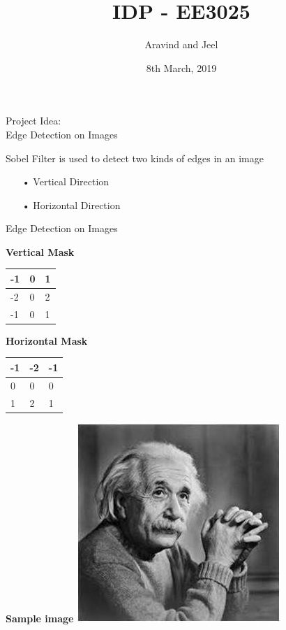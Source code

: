 \documentclass[11pt]{beamer}
\author{Aravind and Jeel}
\title{IDP - EE3025}
\institute{IIT Hyderabad}
\date{8th March, 2019}
\begin{document}
\begin{frame}
\titlepage
\end{frame}

\begin{frame}{Project Idea: \\ Edge Detection on Images}

	Sobel Filter is used to detect two kinds of edges in an image \\
	\begin{itemize}
	\item[•] Vertical Direction
	\item[•] Horizontal Direction
	\end{itemize}
	
\end{frame}

\begin{frame}{Edge Detection on Images}
	
	\textbf{Vertical Mask}
	\begin{center}
	
	\begin{tabular}{|m{1cm}|m{1cm}|m{1cm}|}
	\hline
	-1 & 0 & 1 \\
	\hline
	-2 & 0 & 2 \\
	\hline
	-1 & 0 & 1 \\
	\hline
	
	\end{tabular}
	\end{center}
	\pause
	\textbf{Horizontal Mask}
	\begin{center}
	
	\begin{tabular}{|m{1cm}|m{1cm}|m{1cm}|}
	\hline
	-1 & -2 & -1 \\
	\hline
	0 & 0 & 0 \\
	\hline
	1 & 2 & 1 \\
	\hline
	
	\end{tabular}
	\end{center}
	
\end{frame}

\begin{frame}
\textbf{Sample image}
\includegraphics{sobel1}
\end{frame}
\end{document}

